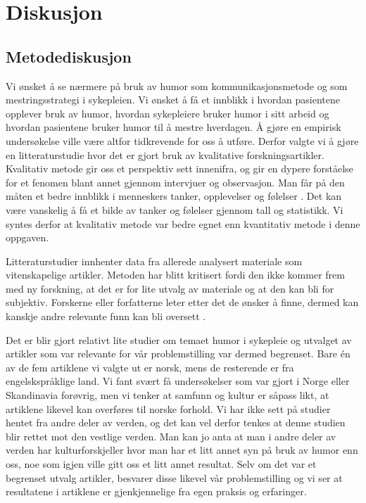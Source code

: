 \chapter{Diskusjon}

\section{Metodediskusjon}

Vi ønsket å se nærmere på bruk av humor som kommunikasjonsmetode og som
mestringsstrategi i sykepleien. Vi ønsket å få et innblikk i hvordan pasientene
opplever bruk av humor, hvordan sykepleiere bruker humor i sitt arbeid og
hvordan pasientene bruker humor til å mestre hverdagen. Å gjøre en empirisk
undersøkelse ville være altfor tidkrevende for oss å utføre. Derfor valgte vi å
gjøre en litteraturstudie hvor det er gjort bruk av kvalitative
forskningsartikler. Kvalitativ metode gir oss et perspektiv sett innenifra, og
gir en dypere forståelse for et fenomen blant annet gjennom intervjuer og
observasjon. Man får på den måten et bedre innblikk i menneskers tanker,
opplevelser og følelser \cite{segesten2006}. Det kan være vanskelig å få et
bilde av tanker og følelser gjennom tall og statistikk. Vi syntes derfor at
kvalitativ metode var bedre egnet enn kvantitativ metode i denne oppgaven. 

Litteraturstudier innhenter data fra allerede analysert materiale som
vitenskapelige artikler. Metoden har blitt kritisert fordi den ikke kommer frem
med ny forskning, at det er for lite utvalg av materiale og at den kan bli for
subjektiv. Forskerne eller forfatterne leter etter det de ønsker å finne,
dermed kan kanskje andre relevante funn kan bli oversett \cite{friberg2006}.

Det er blir gjort relativt lite studier om temaet humor i sykepleie og utvalget
av artikler som var relevante for vår problemstilling var dermed begrenset.
Bare én av de fem artiklene vi valgte ut er norsk, mens de resterende er fra
engelskspråklige land. Vi fant svært få undersøkelser som var gjort i Norge
eller Skandinavia forøvrig, men vi tenker at samfunn og kultur er såpass likt,
at artiklene likevel kan overføres til norske forhold. Vi har ikke sett på
studier hentet fra andre deler av verden, og det kan vel derfor tenkes at denne
studien blir rettet mot den vestlige verden. Man kan jo anta at man i andre
deler av verden har kulturforskjeller hvor man har et litt annet syn på bruk av
humor enn oss, noe som igjen ville gitt oss et litt annet resultat. Selv om det
var et begrenset utvalg artikler, besvarer disse likevel vår problemstilling og
vi ser at resultatene i artiklene er gjenkjennelige fra egen praksis og
erfaringer.

